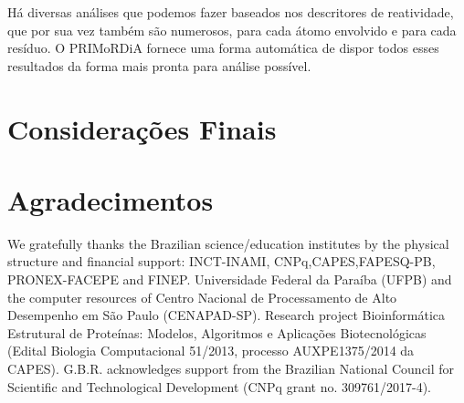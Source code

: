 \documentclass[a4paper,11pt]{refart}
\begin{document}
 
	 
	 Há diversas análises que podemos fazer baseados nos descritores de reatividade, que por sua vez também são numerosos, para cada átomo envolvido e para cada resíduo. O PRIMoRDiA fornece uma forma automática de dispor todos esses resultados da forma mais pronta para análise possível. 
	
	\section{Considerações Finais}
	
	\newpage
	\section*{Agradecimentos}
	
	We gratefully thanks the Brazilian science/education institutes by the physical structure and financial support: INCT-INAMI, CNPq,CAPES,FAPESQ-PB, PRONEX-FACEPE and FINEP. Universidade Federal da Paraíba (UFPB) and the computer resources of Centro Nacional de Processamento de Alto Desempenho em São Paulo (CENAPAD-SP). 		
	Research project Bioinformática Estrutural de Proteínas: Modelos, Algoritmos e Aplicações Biotecnológicas (Edital Biologia Computacional 51/2013, processo AUXPE1375/2014 da CAPES). G.B.R. acknowledges support from the Brazilian National Council for Scientific and Technological Development (CNPq grant no. 309761/2017-4).
	
	
	
	
	\newpage
	
	
	
\end{document}
